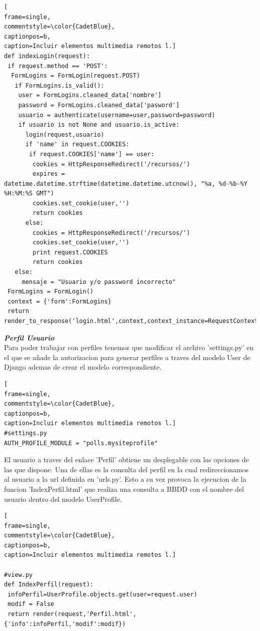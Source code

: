 \begin{lstlisting}[
frame=single,
commentstyle=\color{CadetBlue},
captionpos=b,
caption=Incluir elementos multimedia remotos l.]
def indexLogin(request):
 if request.method == 'POST':
  FormLogins = FormLogin(request.POST)
   if FormLogins.is_valid():
    user = FormLogins.cleaned_data['nombre']
	password = FormLogins.cleaned_data['pasword']
	usuario = authenticate(username=user,password=password) 
	if usuario is not None and usuario.is_active:
	  login(request,usuario)
	  if 'name' in request.COOKIES:
	   if request.COOKIES['name'] == user:
	    cookies = HttpResponseRedirect('/recursos/')
		expires = datetime.datetime.strftime(datetime.datetime.utcnow(), "%a, %d-%b-%Y %H:%M:%S GMT")
		cookies.set_cookie(user,'')
		return cookies
	  else:
	    cookies = HttpResponseRedirect('/recursos/')
		cookies.set_cookie(user,'')
		print request.COOKIES
		return cookies
   else:
     mensaje = "Usuario y/o password incorrecto"
 FormLogins = FormLogin()
 context = {'form':FormLogins}
 return render_to_response('login.html',context,context_instance=RequestContext(request))
\end{lstlisting}
\textbf{\textit{Perfil Usuario}}
\\Para poder trabajar con perfiles tenemos que modificar el archivo 'settings.py' en el que se añade la autorizacion para generar perfiles a traves del modelo User de Django ademas de crear el modelo correspondiente.
\lstset{language=, breaklines=true, basicstyle=\footnotesize}
\begin{lstlisting}[
frame=single,
commentstyle=\color{CadetBlue},
captionpos=b,
caption=Incluir elementos multimedia remotos l.]
#settings.py
AUTH_PROFILE_MODULE = "polls.mysiteprofile"
\end{lstlisting}
El usuario a traves del enlace 'Perfil' obtiene un desplegable con las opciones de las que dispone. Una de ellas es la consulta del perfil en la cual  redireccionamos al usuario a la url  definida en 'urls.py'. Esto a su vez provoca la ejecucion de la funcion 'IndexPerfil.html' que realiza una consulta a BBDD con el nombre del usuario dentro del modelo UserProfile.
\lstset{language=, breaklines=true, basicstyle=\footnotesize}
\begin{lstlisting}[
frame=single,
commentstyle=\color{CadetBlue},
captionpos=b,
caption=Incluir elementos multimedia remotos l.]

#view.py
def IndexPerfil(request):
 infoPerfil=UserProfile.objects.get(user=request.user)
 modif = False
 return render(request,'Perfil.html',{'info':infoPerfil,'modif':modif})
\end{lstlisting}
